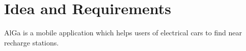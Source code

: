 \chapter{Idea and Requirements}
\label{chap:ideaAndRequirements}
AlGa is a mobile application which helps users of electrical cars to find near recharge stations.
